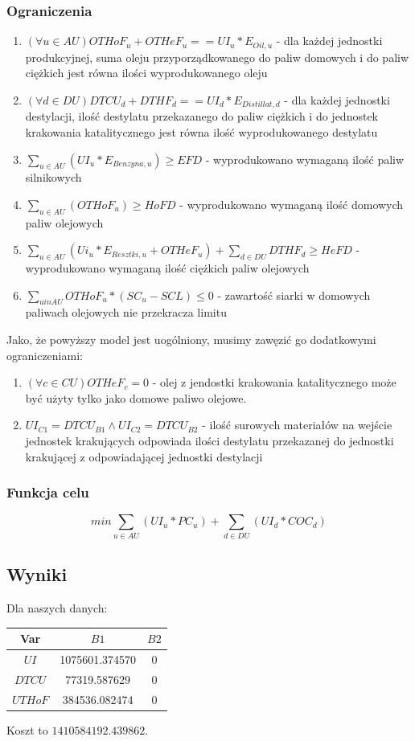 \documentclass{article}
\begin{document}
\subsubsection{Ograniczenia}
\begin{enumerate}
    \item $(\forall u \in AU) OTHoF_u + OTHeF_u == UI_u * E_{Oil, u}$ - dla każdej jednostki produkcyjnej, suma oleju
        przyporządkowanego do paliw domowych i do paliw ciężkich jest równa ilości wyprodukowanego oleju
    \item $(\forall d \in DU) DTCU_d + DTHF_d == UI_d * E_{Distillat, d}$ - dla każdej jednostki destylacji, ilość destylatu
        przekazanego do paliw ciężkich i do jednostek krakowania katalitycznego jest równa ilość wyprodukowanego destylatu
    \item $ \sum_{u \in AU}( UI_u * E_{Benzyna, u}) \ge EFD$ - wyprodukowano wymaganą ilość paliw silnikowych 
    \item $ \sum_{u \in AU}(OTHoF_u) \ge HoFD$ - wyprodukowano wymaganą ilość domowych paliw olejowych
    \item $ \sum_{u \in AU}( Ui_u * E_{Resztki,u} + OTHeF_u) + \sum_{d \in DU} DTHF_d \ge HeFD$ - wyprodukowano wymaganą ilość ciężkich 
        paliw olejowych
    \item $ \sum_{u in AU} OTHoF_u * (SC_u - SCL) \le 0 $ - zawartość siarki w domowych paliwach olejowych nie przekracza limitu
\end{enumerate}

Jako, że powyższy model jest uogólniony, musimy zawęzić go dodatkowymi ograniczeniami:

\begin{enumerate}
    \item $ (\forall c \in CU) OTHeF_c = 0 $ - olej z jendostki krakowania katalitycznego może być użyty tylko
        jako domowe paliwo olejowe.
    \item $ UI_{C1} = DTCU_{B1} \land UI_{C2} = DTCU_{B2} $ - ilość surowych materiałów na wejście jednostek krakujących
        odpowiada ilości destylatu przekazanej do jednostki krakującej z odpowiadającej jednostki destylacji
\end{enumerate}

\subsubsection{Funkcja celu}
\[min \sum_{u \in AU}(UI_u * PC_u) + \sum_{d \in DU}(UI_d * COC_d)\]

\subsection{Wyniki}
Dla naszych danych:
\begin{center}
    \begin{tabular}{| c | c | c |} \hline
    Var & $B1$ & $B2$ \\ \hline
    $UI$ & 1075601.374570 & 0 \\ \hline
    $DTCU$ & 77319.587629 & 0 \\ \hline
    $UTHoF$ & 384536.082474 & 0 \\ \hline
    \end{tabular}
\end{center}
Koszt to $1410584192.439862$.
\end{document}
